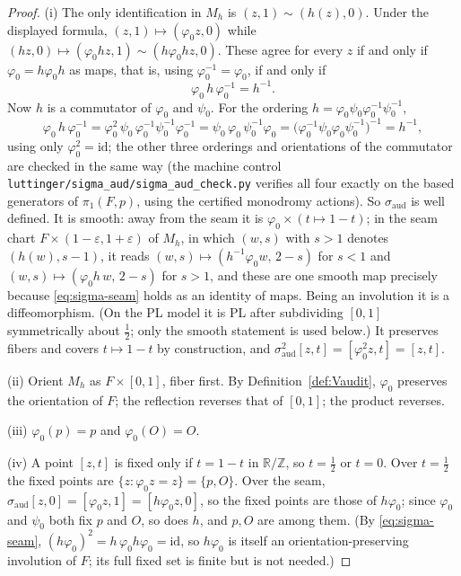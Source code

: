 \documentclass[11pt]{article}
\theoremstyle{definition}
\begin{document}
\begin{proof}
(i) The only identification in $M_h$ is $(z,1)\sim(h(z),0)$.  Under the
displayed formula, $(z,1)\mapsto(\varphi_0 z,0)$ while
$(h z,0)\mapsto(\varphi_0 h z,1)\sim(h\varphi_0 h z,0)$.  These agree for
every $z$ if and only if $\varphi_0=h\varphi_0 h$ as maps, that is,
using $\varphi_0^{-1}=\varphi_0$, if and only if
\begin{equation}\label{eq:sigma-seam}
 \varphi_0\,h\,\varphi_0^{-1}=h^{-1}.
\end{equation}
Now $h$ is a commutator of $\varphi_0$ and $\psi_0$.  For the ordering
$h=\varphi_0\psi_0\varphi_0^{-1}\psi_0^{-1}$,
\[
 \varphi_0\,h\,\varphi_0^{-1}
 =\varphi_0^{2}\,\psi_0\,\varphi_0^{-1}\psi_0^{-1}\varphi_0^{-1}
 =\psi_0\,\varphi_0\,\psi_0^{-1}\varphi_0
 =\bigl(\varphi_0^{-1}\psi_0\varphi_0\psi_0^{-1}\bigr)^{-1}
 =h^{-1},
\]
using only $\varphi_0^{2}=\mathrm{id}$; the other three orderings and
orientations of the commutator are checked in the same way (the machine
control \texttt{luttinger/sigma\_aud/sigma\_aud\_check.py} verifies all
four exactly on the based generators of $\pi_1(F,p)$, using the
certified monodromy actions).  So $\sigma_{\mathrm{aud}}$ is well defined.
It is smooth: away from the seam it is $\varphi_0\times(t\mapsto1-t)$;
in the seam chart $F\times(1-\varepsilon,1+\varepsilon)$ of $M_h$, in
which $(w,s)$ with $s>1$ denotes $(h(w),s-1)$, it reads
$(w,s)\mapsto(h^{-1}\varphi_0 w,\,2-s)$ for $s<1$ and
$(w,s)\mapsto(\varphi_0 h\,w,\,2-s)$ for $s>1$, and these are one smooth
map precisely because \eqref{eq:sigma-seam} holds as an identity of maps.
Being an involution it is a diffeomorphism.  (On the PL model it is PL
after subdividing $[0,1]$ symmetrically about $\tfrac12$; only the smooth
statement is used below.)  It preserves fibers and covers $t\mapsto1-t$ by
construction, and
$\sigma_{\mathrm{aud}}^{2}[z,t]=[\varphi_0^{2}z,t]=[z,t]$.

(ii) Orient $M_h$ as $F\times[0,1]$, fiber first.  By
Definition~\ref{def:Vaudit}, $\varphi_0$ preserves the orientation of
$F$; the reflection reverses that of $[0,1]$; the product reverses.

(iii) $\varphi_0(p)=p$ and $\varphi_0(O)=O$.

(iv) A point $[z,t]$ is fixed only if $t=1-t$ in $\mathbb R/\mathbb Z$,
so $t=\tfrac12$ or $t=0$.  Over $t=\tfrac12$ the fixed points are
$\{z:\varphi_0 z=z\}=\{p,O\}$.  Over the seam,
$\sigma_{\mathrm{aud}}[z,0]=[\varphi_0 z,1]=[h\varphi_0 z,0]$, so the
fixed points are those of $h\varphi_0$; since $\varphi_0$ and $\psi_0$
both fix $p$ and $O$, so does $h$, and $p,O$ are among them.  (By
\eqref{eq:sigma-seam}, $(h\varphi_0)^2=h\,\varphi_0h\varphi_0=\mathrm{id}$,
so $h\varphi_0$ is itself an orientation-preserving involution of $F$;
its full fixed set is finite but is not needed.)
\end{proof}
\end{document}
